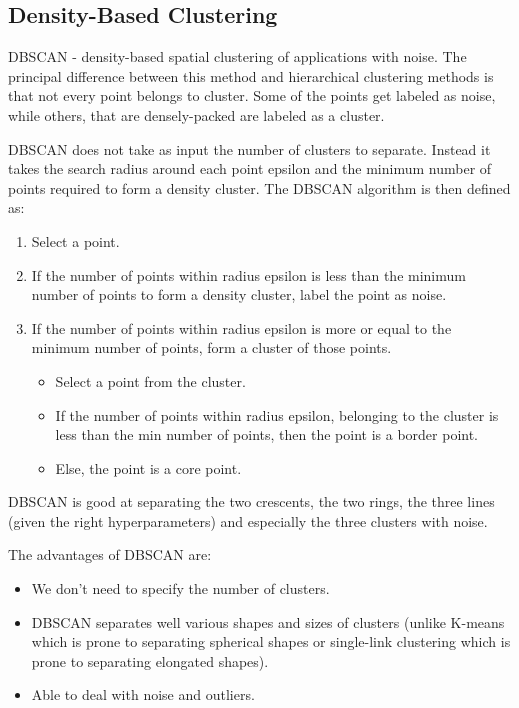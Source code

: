 \documentclass{article}
\begin{document}
\subsection{Density-Based Clustering}
DBSCAN - density-based spatial clustering of applications with noise. The principal difference between this method and hierarchical clustering methods is that not every point belongs to cluster. Some of the points get labeled as noise, while others, that are densely-packed are labeled as a cluster.

DBSCAN does not take as input the number of clusters to separate. Instead it takes the search radius around each point epsilon and the minimum number of points required to form a density cluster. The DBSCAN algorithm is then defined as:

\begin{enumerate}
  \item Select a point.
  \item If the number of points within radius epsilon is less than the minimum number of points to form a density cluster, label the point as noise.
  \item If the number of points within radius epsilon is more or equal to the minimum number of points, form a cluster of those points.
  \begin{itemize}
    \item Select a point from the cluster.
    \item If the number of points within radius epsilon, belonging to the cluster is less than the min number of points, then the point is a border point.
    \item Else, the point is a core point.
  \end{itemize}
\end{enumerate}

DBSCAN is good at separating the two crescents, the two rings, the three lines (given the right hyperparameters) and especially the three clusters with noise.

The advantages of DBSCAN are:

\begin{itemize}
  \item We don’t need to specify the number of clusters.
  \item DBSCAN separates well various shapes and sizes of clusters (unlike K-means which is prone to separating spherical shapes or single-link clustering which is prone to separating elongated shapes).
  \item Able to deal with noise and outliers.
\end{itemize}
\end{document}
